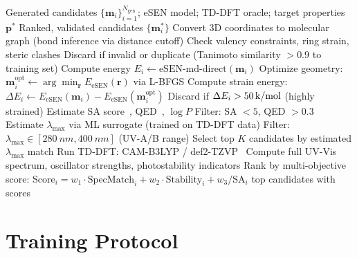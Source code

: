 \documentclass[12pt,a4paper]{article}
\begin{document}
\begin{algorithm}[H]
\caption{eSEN-Powered Screening Pipeline}\label{alg:screening}
\begin{algorithmic}[1]
\Require Generated candidates $\{\bm{m}_i\}_{i=1}^{N_{\text{gen}}}$; eSEN model; TD-DFT oracle; target properties $\bm{p}^*$
\Ensure Ranked, validated candidates $\{\bm{m}_i^*\}$
\State {}
    \State Convert 3D coordinates to molecular graph (bond inference via distance cutoff)
    \State Check valency constraints, ring strain, steric clashes
    \State Discard if invalid or duplicate (Tanimoto similarity $> 0.9$ to training set)
\EndFor
\State {}
    \State Compute energy $E_i \gets \text{eSEN-md-direct}(\bm{m}_i)$ 
    \State Optimize geometry: $\bm{m}_i^{\text{opt}} \gets \arg\min_{\bm{r}} E_{\text{eSEN}}(\bm{r})$ via L-BFGS
    \State Compute strain energy: $\Delta E_i \gets E_{\text{eSEN}}(\bm{m}_i) - E_{\text{eSEN}}(\bm{m}_i^{\text{opt}})$
    \State Discard if $\Delta E_i > \SI{50}{\kilo\cal\per\mol}$ (highly strained)
\EndFor
\State {}
    \State Estimate SA score~\cite{ertl2009sa}, QED~\cite{bickerton2012qed}, $\log P$
    \State Filter: SA $< 5$, QED $> 0.3$
    \State Estimate $\lambda_{\max}$ via ML surrogate (trained on TD-DFT data)
    \State Filter: $\lambda_{\max} \in [\SI{280}{nm}, \SI{400}{nm}]$ (UV-A/B range)
\EndFor
\State {}
\State Select top $K$ candidates by estimated $\lambda_{\max}$ match
    \State Run TD-DFT: CAM-B3LYP / def2-TZVP~\cite{yanai2004camb3lyp, casida1995tddft}
    \State Compute full UV-Vis spectrum, oscillator strengths, photostability indicators
\EndFor
\State {}
\State Rank by multi-objective score: $\text{Score}_i = w_1 \cdot \text{SpecMatch}_i + w_2 \cdot \text{Stability}_i + w_3 / \text{SA}_i$
\State \Return top candidates with scores
\end{algorithmic}
\end{algorithm}

\section{Training Protocol}\label{sec:training}
\end{document}

